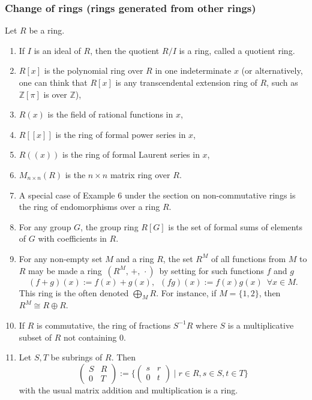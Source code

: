 \documentclass[12pt]{article}
\begin{document}
\subsubsection*{Change of rings (rings generated from other rings)}
Let $R$ be a ring.
\begin{enumerate}
\item If $I$ is an ideal of $R$, then the quotient $R/I$ is a ring, called a quotient ring.
\item $R[x]$ is the polynomial ring over $R$ in one indeterminate $x$ (or alternatively, one can think that $R[x]$ is any transcendental extension ring of $R$, such as $\mathbb{Z}[\pi]$ is over $\mathbb{Z}$),
\item $R(x)$ is the field of rational functions in $x$,
\item $R[[x]]$ is the ring of formal power series in $x$,
\item $R((x))$ is the ring of formal Laurent series in $x$,
\item $M_{n\times n}(R)$ is the $n\times n$ matrix ring over $R$.
\item A special case of Example 6 under the section on non-commutative rings is the ring of endomorphisms over a ring $R$.
\item For any group $G$, the group ring $R[G]$ is the set of formal sums of elements of $G$ with coefficients in $R$. 
\item For any non-empty set $M$ and a ring $R$, the set $R^M$ of all functions from $M$ to $R$ may be made a ring\, $(R^M,\,+,\,\cdot)$\, by setting for such functions $f$ and $g$
$$(f\!+\!g)(x) := f(x)+g(x), \,\,\, (fg)(x) := f(x)g(x)\,\,\, \forall x\in M.$$
This ring is the often denoted $\bigoplus_{M} R$.  For instance, if $M=\{1,2\}$, then $R^M\cong R\oplus R$.

\item If $R$ is commutative, the ring of fractions $S^{-1}R$ where $S$ is a multiplicative subset of $R$ not containing 0.
\item Let $S,T$ be subrings of $R$.  Then
$$\begin{pmatrix} S&R \\ 0&T \end{pmatrix}:=\Big\lbrace \begin{pmatrix} s&r \\ 0&t \end{pmatrix}\mid r\in R, s\in S, t\in T \Big\rbrace$$
with the usual matrix addition and multiplication is a ring.
\end{enumerate}
\end{document}
